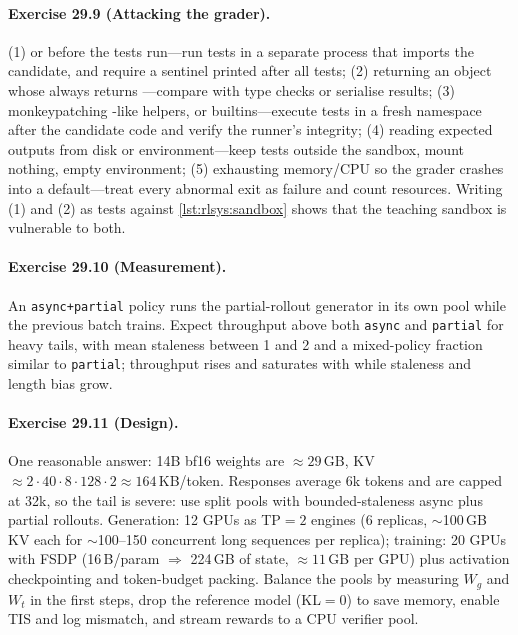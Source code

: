 \paragraph{Exercise 29.9 (Attacking the grader).}
(1)  or  before the tests run---run tests in a separate process
that imports the candidate, and require a sentinel printed after all tests; (2) returning an object
whose  always returns ---compare with type checks or serialise results;
(3) monkeypatching -like helpers,  or builtins---execute tests in a fresh
namespace after the candidate code and verify the runner's integrity; (4) reading expected outputs
from disk or environment---keep tests outside the sandbox, mount nothing, empty environment;
(5) exhausting memory/CPU so the grader crashes into a default---treat every abnormal exit as failure
and count resources. Writing (1) and (2) as tests against \cref{lst:rlsys:sandbox} shows that the
teaching sandbox is vulnerable to both.

\paragraph{Exercise 29.10 (Measurement).}
An \texttt{async+partial} policy runs the partial-rollout generator in its own pool while the
previous batch trains. Expect throughput above both \texttt{async} and \texttt{partial} for heavy
tails, with mean staleness between 1 and 2 and a mixed-policy fraction similar to \texttt{partial};
throughput rises and saturates with  while staleness and length bias grow.

\paragraph{Exercise 29.11 (Design).}
One reasonable answer: 14B bf16 weights are $\approx29$\,GB, KV $\approx 2\cdot40\cdot8\cdot128\cdot2
\approx164$\,KB/token. Responses average 6k tokens and are capped at 32k, so the tail is severe:
use split pools with bounded-staleness async plus partial rollouts. Generation: 12 GPUs as TP$=2$
engines (6 replicas, $\sim$100\,GB KV each for $\sim$100--150 concurrent long sequences per replica);
training: 20 GPUs with FSDP (16\,B/param $\Rightarrow$ 224\,GB of state, $\approx11$\,GB per GPU) plus
activation checkpointing and token-budget packing. Balance the pools by measuring $W_g$ and $W_t$
in the first steps, drop the reference model (KL$=0$) to save memory, enable TIS and log mismatch,
and stream rewards to a CPU verifier pool.
